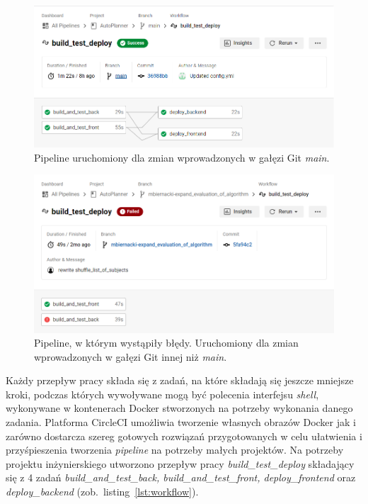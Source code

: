 	
\begin{figure}[H]
\centering\includegraphics[width=\textwidth]{figures/ppl_flow}
\caption{Pipeline uruchomiony dla zmian wprowadzonych w gałęzi Git \textit{main}.}\label{rys:passed_ppl}
\end{figure}

\begin{figure}[H]
\centering\includegraphics[width=\textwidth]{figures/ppl_flow_fail}
\caption{Pipeline, w którym wystąpiły błędy. Uruchomiony dla zmian wprowadzonych w gałęzi Git innej niż \textit{main}.}\label{rys:error_ppl}
\end{figure}

	Każdy przepływ pracy składa się z zadań, na które składają się jeszcze mniejsze kroki, podczas których wywoływane mogą być polecenia interfejsu \textit{shell}, wykonywane w kontenerach Docker stworzonych na potrzeby wykonania danego zadania. Platforma CircleCI umożliwia tworzenie własnych obrazów Docker jak i zarówno dostarcza szereg gotowych rozwiązań przygotowanych w celu ułatwienia i przyśpieszenia tworzenia \textit{pipeline} na potrzeby małych projektów. Na potrzeby projektu inżynierskiego utworzono przepływ pracy \textit{build\_test\_deploy} składający się z 4 zadań \textit{build\_and\_test\_back, build\_and\_test\_front, deploy\_frontend} oraz \textit{deploy\_backend} (zob.~listing~\ref{lst:workflow}).
	
